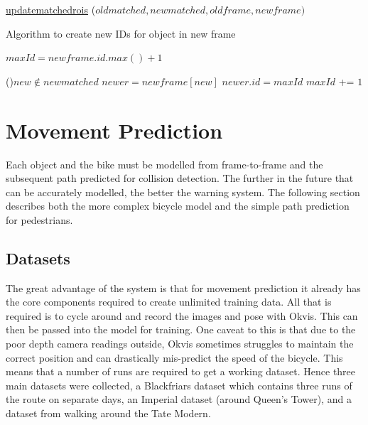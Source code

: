 \documentclass[11pt,twoside]{report}
\begin{document}
\begin{algorithm}[H]
	\DontPrintSemicolon
	\SetAlgoLined
	\underline{update\textunderscore matched\textunderscore rois} ($old$\textunderscore$matched,new$\textunderscore$matched,old$\textunderscore$frame,new$\textunderscore$frame)$\;
	\texttt{\\}
	\caption{Algorithm to create new IDs for object in new frame}
	\label{alg:weights}
\end{algorithm}

\newpage

$maxId = new$\textunderscore$frame.id.max()+1$ 

\ForEach(){$new \notin new$\textunderscore$matched$}{
$newer = new$\textunderscore$frame[new]$ 
$newer.id = maxId$ 
$maxId$ += $1$ 
}


\section{Movement Prediction}

Each object and the bike must be modelled from frame-to-frame and the subsequent path predicted for collision detection. The further in the future that can be accurately modelled, the better the warning system. The following section describes both the more complex bicycle model and the simple path prediction for pedestrians.


\subsection{Datasets}
The great advantage of the system is that for movement prediction it already has the core components required to create unlimited training data. All that is required is to cycle around and record the images and pose with Okvis. This can then be passed into the model for training. One caveat to this is that due to the poor depth camera readings outside, Okvis sometimes struggles to maintain the correct position and can drastically mis-predict the speed of the bicycle. This means that a number of runs are required to get a working dataset. Hence three main datasets were collected, a Blackfriars dataset which contains three runs of the route on separate days, an Imperial dataset (around Queen's Tower), and a dataset from walking around the Tate Modern.
\end{document}
